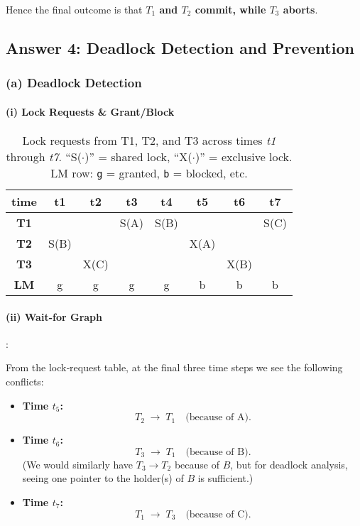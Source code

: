 \documentclass[11pt]{article}
\begin{document}
\noindent
Hence the final outcome is that \textbf{$T_1$ and $T_2$ commit, while $T_3$ aborts}.
\subsection*{Answer 4: Deadlock Detection and Prevention}

\subsubsection*{(a) \; Deadlock Detection}

\paragraph{(i) Lock Requests \& Grant/Block}
\begin{table}[!ht]
\centering
\begin{tabular}{c|ccccccc}
\textbf{time} & \textbf{t1} & \textbf{t2} & \textbf{t3} & \textbf{t4} & \textbf{t5} & \textbf{t6} & \textbf{t7} \\
\hline
\textbf{T1} &  &  & S(A) & S(B) &  &  & S(C) \\
\textbf{T2} & S(B) &  &  &  & X(A) &  &  \\
\textbf{T3} &  & X(C) & &  &  & X(B) &  \\
\hline
\textbf{LM} & g & g & g & g & b & b & b \\
\end{tabular}
\caption{Lock requests from T1, T2, and T3 across times \textit{t1} through \textit{t7}. 
``S($\cdot$)'' = shared lock, ``X($\cdot$)'' = exclusive lock. 
LM row: \texttt{g} = granted, \texttt{b} = blocked, etc.}
\end{table}

\paragraph{(ii) Wait-for Graph}:

From the lock‐request table, at the final three time steps we see the following conflicts:

\begin{itemize}
  \item \textbf{Time $t_5$:} 
    \[
      T_2 \;\longrightarrow\; T_1 \quad\text{(because of A).}
    \]

  \item \textbf{Time $t_6$:} 
    \[
      T_3 \;\longrightarrow\; T_1 \quad\text{(because of B).}
    \]
    (We would similarly have \(T_3 \to T_2\) because of $B$, but for deadlock analysis,
    seeing one pointer to the holder(s) of $B$ is sufficient.)

  \item \textbf{Time $t_7$:} 
    \[
      T_1 \;\longrightarrow\; T_3 \quad\text{(because of C).}
    \]
\end{itemize}
\end{document}
